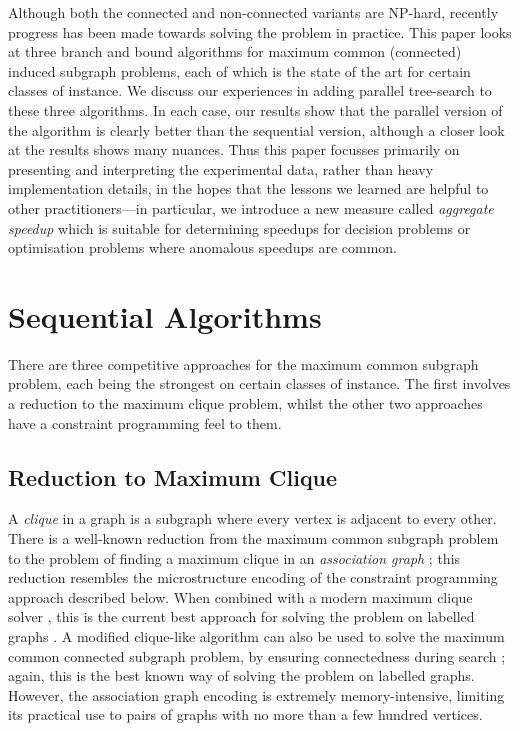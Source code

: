\documentclass{llncs}
\begin{document}
Although both the connected and non-connected variants are NP-hard, recently progress has been made
towards solving the problem in practice.  This paper looks at three branch and bound algorithms for
maximum common (connected) induced subgraph problems, each of which is the state of the art for
certain classes of instance. We discuss our experiences in adding parallel tree-search to these
three algorithms. In each case, our results show that the parallel version of the algorithm is
clearly better than the sequential version, although a closer look at the results shows many
nuances. Thus this paper focusses primarily on presenting and interpreting the experimental data,
rather than heavy implementation details, in the hopes that the lessons we learned are helpful to
other practitioners---in particular, we introduce a new measure called \emph{aggregate speedup}
which is suitable for determining speedups for decision problems or optimisation problems where
anomalous speedups are common.

\section{Sequential Algorithms}

There are three competitive approaches for the maximum common subgraph problem, each being the
strongest on certain classes of instance. The first involves a reduction to the maximum clique
problem, whilst the other two approaches have a constraint programming feel to them.

\subsection{Reduction to Maximum Clique}

A \emph{clique} in a graph is a subgraph where every vertex is adjacent to every other. There is a
well-known reduction from the maximum common subgraph problem to the problem of finding a maximum
clique in an \emph{association graph}
\cite{o:Levi73,DBLP:journals/jcamd/RaymondW02a,DBLP:conf/cp/McCreeshNPS16}; this reduction
resembles the microstructure encoding \cite{DBLP:conf/aaai/Jegou93a} of the constraint programming
approach described below. When combined with a modern maximum clique solver
\cite{DBLP:journals/ol/SegundoMRH13}, this is the current best approach for solving the problem on
labelled graphs \cite{DBLP:conf/cp/McCreeshNPS16}. A modified clique-like algorithm can also be
used to solve the maximum common connected subgraph problem, by ensuring connectedness during search
\cite{DBLP:conf/cp/McCreeshNPS16}; again, this is the best known way of solving the problem on
labelled graphs. However, the association graph encoding is extremely memory-intensive, limiting its
practical use to pairs of graphs with no more than a few hundred vertices.
\end{document}
